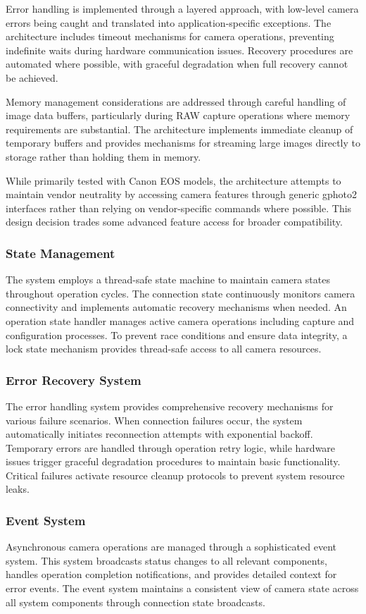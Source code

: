 Error handling is implemented through a layered approach, with low-level camera errors being caught and translated into application-specific exceptions. The architecture includes timeout mechanisms for camera operations, preventing indefinite waits during hardware communication issues. Recovery procedures are automated where possible, with graceful degradation when full recovery cannot be achieved.

Memory management considerations are addressed through careful handling of image data buffers, particularly during RAW capture operations where memory requirements are substantial. The architecture implements immediate cleanup of temporary buffers and provides mechanisms for streaming large images directly to storage rather than holding them in memory.

While primarily tested with Canon EOS models, the architecture attempts to maintain vendor neutrality by accessing camera features through generic gphoto2 interfaces rather than relying on vendor-specific commands where possible. This design decision trades some advanced feature access for broader compatibility.
\subsubsection{State Management}
The system employs a thread-safe state machine to maintain camera states throughout operation cycles. The connection state continuously monitors camera connectivity and implements automatic recovery mechanisms when needed. An operation state handler manages active camera operations including capture and configuration processes. To prevent race conditions and ensure data integrity, a lock state mechanism provides thread-safe access to all camera resources.

\subsubsection{Error Recovery System}
The error handling system provides comprehensive recovery mechanisms for various failure scenarios. When connection failures occur, the system automatically initiates reconnection attempts with exponential backoff. Temporary errors are handled through operation retry logic, while hardware issues trigger graceful degradation procedures to maintain basic functionality. Critical failures activate resource cleanup protocols to prevent system resource leaks.

\subsubsection{Event System}
Asynchronous camera operations are managed through a sophisticated event system. This system broadcasts status changes to all relevant components, handles operation completion notifications, and provides detailed context for error events. The event system maintains a consistent view of camera state across all system components through connection state broadcasts.

